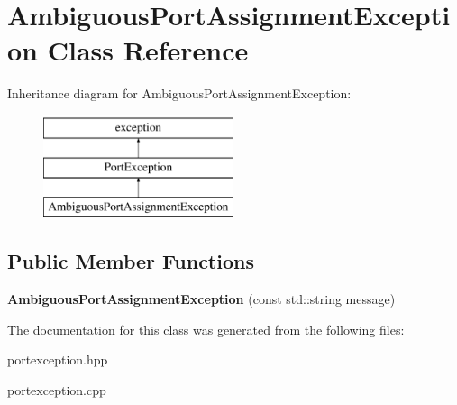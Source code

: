 \hypertarget{class_ambiguous_port_assignment_exception}{}\section{Ambiguous\+Port\+Assignment\+Exception Class Reference}
\label{class_ambiguous_port_assignment_exception}
Inheritance diagram for Ambiguous\+Port\+Assignment\+Exception\+:\begin{figure}[H]
\begin{center}
\leavevmode
\includegraphics[height=3.000000cm]{class_ambiguous_port_assignment_exception}
\end{center}
\end{figure}
\subsection*{Public Member Functions}
\begin{DoxyCompactItemize}
\item 
\hypertarget{class_ambiguous_port_assignment_exception_a5c2daf243080521a90629fcc262dec61}{}{\bfseries Ambiguous\+Port\+Assignment\+Exception} (const std\+::string message)\label{class_ambiguous_port_assignment_exception_a5c2daf243080521a90629fcc262dec61}

\end{DoxyCompactItemize}


The documentation for this class was generated from the following files\+:\begin{DoxyCompactItemize}
\item 
portexception.\+hpp\item 
portexception.\+cpp\end{DoxyCompactItemize}
